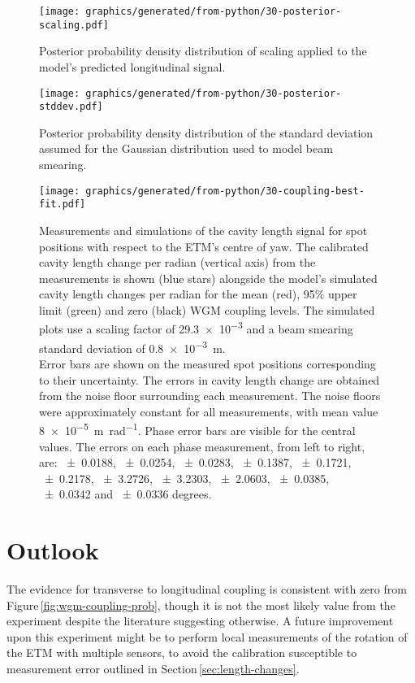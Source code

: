 \begin{figure}
  \centering
  \texttt{[image: graphics/generated/from-python/30-posterior-scaling.pdf]}
  \caption{\label{fig:posterior-scaling}Posterior probability density distribution of scaling applied to the model's predicted longitudinal signal.}
\end{figure}

\begin{figure}
  \texttt{[image: graphics/generated/from-python/30-posterior-stddev.pdf]}
  \caption{\label{fig:posterior-stddev}Posterior probability density distribution of the standard deviation assumed for the Gaussian distribution used to model beam smearing.}
\end{figure}

\begin{figure}
  \centering
  \texttt{[image: graphics/generated/from-python/30-coupling-best-fit.pdf]}
  \caption{\label{fig:wgm-coupling}Measurements and simulations of the cavity length signal for spot positions with respect to the \gls{ETM}'s centre of yaw. The calibrated cavity length change per radian (vertical axis) from the measurements is shown (blue stars) alongside the model's simulated cavity length changes per radian for the mean (red), 95\% upper limit (green) and zero (black) \gls{WGM} coupling levels. The simulated plots use a scaling factor of \num{29.3e-3} and a beam smearing standard deviation of \SI{0.8e-3}{\meter}.
  \bigskip
  \\ Error bars are shown on the measured spot positions corresponding to their uncertainty. The errors in cavity length change are obtained from the noise floor surrounding each measurement. The noise floors were approximately constant for all measurements, with mean value \SI{8e-5}{\meter \per \radian}. Phase error bars are visible for the central values. The errors on each phase measurement, from left to right, are: \num{+-0.0188}, \num{+-0.0254}, \num{+-0.0283}, \num{+-0.1387}, \num{+-0.1721}, \num{+-0.2178}, \num{+-3.2726}, \num{+-3.2303}, \num{+-2.0603}, \num{+-0.0385}, \num{+-0.0342} and \num{+-0.0336} degrees.}
\end{figure}

\section{Outlook}
The evidence for transverse to longitudinal coupling is consistent with zero from Figure\,\ref{fig:wgm-coupling-prob}, though it is not the most likely value from the experiment despite the literature suggesting otherwise. A future improvement upon this experiment might be to perform local measurements of the rotation of the \gls{ETM} with multiple sensors, to avoid the calibration susceptible to measurement error outlined in Section\,\ref{sec:length-changes}.

